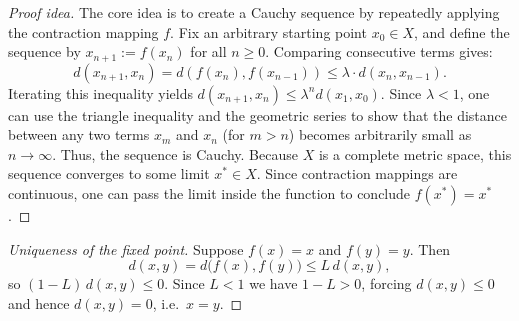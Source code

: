\begin{proof}[Proof idea]
The core idea is to create a Cauchy sequence by repeatedly applying the contraction mapping $f$.
Fix an arbitrary starting point $x_0 \in X$, and define the sequence by $x_{n+1} := f(x_n)$ for all $n \geq 0$.
Comparing consecutive terms gives:
\[
d(x_{n+1}, x_n) = d(f(x_n), f(x_{n-1})) \leq \lambda \cdot d(x_n, x_{n-1}).
\]
Iterating this inequality yields $d(x_{n+1}, x_n) \leq \lambda^n d(x_1, x_0)$. Since $\lambda < 1$, one can use the triangle inequality and the geometric series to show that the distance between any two terms $x_m$ and $x_n$ (for $m > n$) becomes arbitrarily small as $n \to \infty$. Thus, the sequence is Cauchy.
Because $X$ is a complete metric space, this sequence converges to some limit $x^* \in X$. Since contraction mappings are continuous, one can pass the limit inside the function to conclude $f(x^*) = x^*$.
\end{proof}

\begin{proof}[Uniqueness of the fixed point]
Suppose $f(x) = x$ and $f(y) = y$. Then
\[d(x,y) = d\big(f(x),f(y)\big) \leq L\,d(x,y),\]
so $(1-L)\,d(x,y) \leq 0$. Since $L<1$ we have $1-L>0$, forcing $d(x,y) \leq 0$ and hence
$d(x,y)=0$, i.e.\ $x=y$.
\end{proof}


